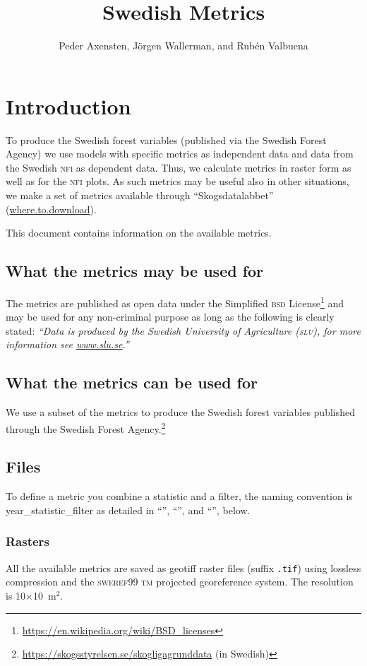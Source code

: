 \documentclass[10pt,english,a4paper
]{article}
\title{Swedish {\lidar} Metrics}
\author{Peder Axensten, Jörgen Wallerman, and Rubén Valbuena}
\newcommand{\download}{“Skogsdatalabbet” (\url{where.to.download})}
\newcommand{\mname}[1]{{\small\texttt{#1}}}
\begin{document}
\maketitle


\section{Introduction}\label{introduction}

To produce the Swedish forest variables (published via the Swedish Forest Agency) we use models with specific metrics as independent data and data from the Swedish \textsc{nfi} as dependent data. Thus, we calculate metrics in raster form as well as for the \textsc{nfi} plots. As such metrics may be useful also in other situations, we make a set of metrics available through {\download}. 

This document contains information on the available metrics. 


\subsection{What the metrics may be used for}

The metrics are published as open data under the Simplified \textsc{bsd} License\footnote{\url{https://en.wikipedia.org/wiki/BSD_licenses}} and may be used for any non-criminal purpose as long as the following is clearly stated:
\emph{“Data is produced by the Swedish University of Agriculture (\textsc{slu}), for more information see \url{www.slu.se}.”}


\subsection{What the metrics can be used for}

We use a subset of the metrics to produce the Swedish forest variables published through the Swedish Forest Agency.\footnote{\url{https://skogsstyrelsen.se/skogligagrunddata} (in Swedish)}


\subsection{Files}

To define a metric you combine a statistic and a filter, the naming convention is year\_statistic\_filter as detailed in “”, “”, and “”, below.

\subsubsection{Rasters}
All the available metrics are saved as geotiff raster files (suffix \mname{.tif}) using lossless compression and the \textsc{sweref}99 \textsc{tm} projected georeference system. The resolution is 10$\times$10~m$^2$.
\end{document}
